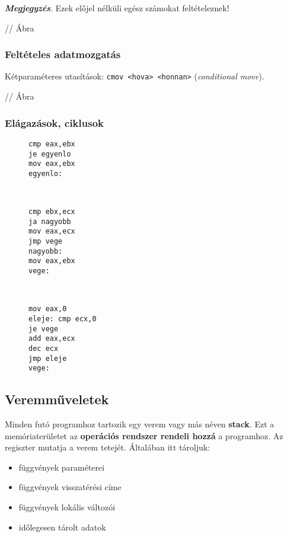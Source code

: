 \textbf{\textit{Megjegyzés}}. Ezek előjel nélküli egész számokat feltételeznek!

// Ábra

\subsubsection{Feltételes adatmozgatás}

Kétparaméteres utasítások: \texttt{cmov <hova> <honnan>} (\textit{conditional move}).

// Ábra

\subsubsection{Elágazások, ciklusok}

\begin{figure}[h]
	\centering
	\begin{minipage}{0.25\linewidth}
		\begin{lstlisting}[style=asmstyle, caption={Egyágú elágazás}]
cmp eax,ebx
je egyenlo
mov eax,ebx
egyenlo:
		\end{lstlisting}
	\end{minipage}
\begin{minipage}{0.05\linewidth}
	~
\end{minipage}
\begin{minipage}{0.25\linewidth}
	\begin{lstlisting}[style=asmstyle, caption={Kétágú elágazás}]
cmp ebx,ecx
ja nagyobb
mov eax,ecx
jmp vege
nagyobb:
mov eax,ebx
vege:
	\end{lstlisting}
\end{minipage}
\begin{minipage}{0.05\linewidth}
	~
\end{minipage}
\begin{minipage}{0.25\linewidth}
	\begin{lstlisting}[style=asmstyle, caption={Ciklus}]
mov eax,0
eleje: cmp ecx,0
je vege
add eax,ecx
dec ecx
jmp eleje
vege:
	\end{lstlisting}
\end{minipage}
\end{figure}

\subsection{Veremműveletek}

Minden futó programhoz tartozik egy verem vagy más néven \textbf{stack}. Ezt a memóriaterületet az \textbf{operációs rendszer rendeli hozzá} a programhoz. Az  regiszter mutatja a verem tetejét. Általában itt tároljuk:
\begin{itemize}
	\item függvények paraméterei
	\item függvények visszatérési címe
	\item függvények lokális változói
	\item időlegesen tárolt adatok
\end{itemize}

